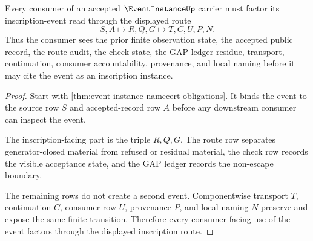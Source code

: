 \begin{theorem}
\label{thm:event-instance-inscription-route}
Every consumer of an accepted $\EventInstanceUp$ carrier must factor its inscription-event read through the displayed route
$$
S,A \longmapsto R,Q,G \longmapsto T,C,U,P,N.
$$
Thus the consumer sees the prior finite observation state, the accepted public record, the route audit, the check state, the GAP-ledger residue, transport, continuation, consumer accountability, provenance, and local naming before it may cite the event as an inscription instance.
\end{theorem}
\begin{proof}
Start with \autoref{thm:event-instance-namecert-obligations}. It binds the event to the source row $S$ and accepted-record row $A$ before any downstream consumer can inspect the event.

The inscription-facing part is the triple $R,Q,G$. The route row separates generator-closed material from refused or residual material, the check row records the visible acceptance state, and the GAP ledger records the non-escape boundary.

The remaining rows do not create a second event. Componentwise transport $T$, continuation $C$, consumer row $U$, provenance $P$, and local naming $N$ preserve and expose the same finite transition. Therefore every consumer-facing use of the event factors through the displayed inscription route.
\end{proof}


